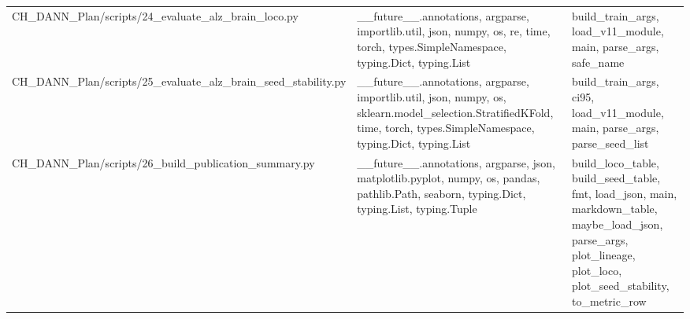 \documentclass[11pt]{article}
\begin{document}
\begin{longtable}{p{}p{}p{}}
CH\_DANN\_Plan/scripts/24\_evaluate\_alz\_brain\_loco.py & \_\_future\_\_.annotations, argparse, importlib.util, json, numpy, os, re, time, torch, types.SimpleNamespace, typing.Dict, typing.List & build\_train\_args, load\_v11\_module, main, parse\_args, safe\_name \\
CH\_DANN\_Plan/scripts/25\_evaluate\_alz\_brain\_seed\_stability.py & \_\_future\_\_.annotations, argparse, importlib.util, json, numpy, os, sklearn.model\_selection.StratifiedKFold, time, torch, types.SimpleNamespace, typing.Dict, typing.List & build\_train\_args, ci95, load\_v11\_module, main, parse\_args, parse\_seed\_list \\
CH\_DANN\_Plan/scripts/26\_build\_publication\_summary.py & \_\_future\_\_.annotations, argparse, json, matplotlib.pyplot, numpy, os, pandas, pathlib.Path, seaborn, typing.Dict, typing.List, typing.Tuple & build\_loco\_table, build\_seed\_table, fmt, load\_json, main, markdown\_table, maybe\_load\_json, parse\_args, plot\_lineage, plot\_loco, plot\_seed\_stability, to\_metric\_row \\
\end{longtable}
\end{document}
